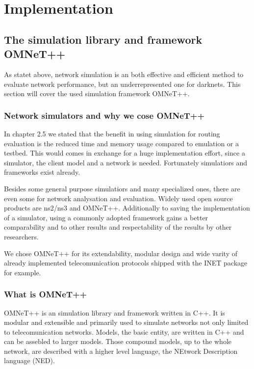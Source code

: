 \chapter{Implementation}

\section{The simulation library and framework OMNeT++}

As statet above, network simulation is an both effective and efficient method to evaluate network performance, but an underrepresented one for darknets. This section will cover the used simulation framework OMNeT++.

\subsection{Network simulators and why we cose OMNeT++}

In chapter 2.5 we stated that the benefit in using simulation for routing evaluation is the reduced time and memory usage compared to emulation or a testbed. This would comes in exchange for a huge implementation effort, since a simulator, the client model and a network is needed. Fortunately simulatiors and frameworks exist already.

Besides some general purpose simulatiors and many specialized ones, there are even some for network analysation and evaluation. Widely used open source products are ns2/ns3 and OMNeT++. Additionally to saving the implementation of a simulator, using a commonly adopted framework gains a better comparability and to other results and respectability of the results by other researchers.

We chose OMNeT++ for its extendability, modular design and wide varity of already implemented telecomunication protocols shipped with the INET package for example.

\subsection{What is OMNeT++}

OMNeT++ is an simulation library and framework written in C++. It is modular and extensible and primarily used to simulate networks not only limited to telecomunication networks. Models, the basic entity, are written in C++ and can be assebled to larger models. Those compound models, up to the whole network, are described with a higher level language, the NEtwork Description language (NED).

